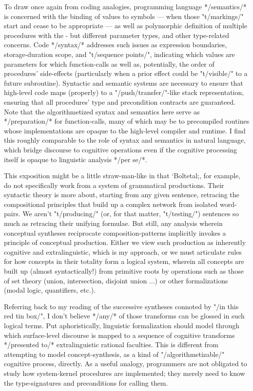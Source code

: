 To draw once again from coding analogies, 
programming language */semantics/* is concerned with the binding 
of values to symbols --- when those "t/markings/" start and 
cease to be appropriate --- as well as polymorphic 
definition of multiple procedures with the -%
but different parameter types, and other type-related 
concerns.  Code */syntax/* addresses such issues as 
expression boundaries, storage-duration scope, and "t/sequence points/", indicating 
which values are parameters for which function-calls as 
well as, potentially, the order of procedures' side-effects 
(particularly when a prior effect could be "t/visible/" to 
a future subroutine).  Syntactic and 
semantic systems are necessary to ensure that high-level code 
maps (properly) to a "/push/transfer/"-like stack representation, ensuring that 
all procedures' type and precondition contracts are guaranteed.
Note that the algorithmetized syntax and semantics here 
serve as */preparation/* for function-calls, many of which 
may be to precompiled routines whose implementations are 
opaque to the high-level compiler and runtime.  I find this 
roughly comparable to the role of syntax and semantics 
in natural language, which bridge discourse to cognitive 
operations even if the cognitive processing itself 
is opaque to linguistic analysis */per se/*. 

This exposition might be a little straw-man-like in that `Boltetal;, 
for example, do not specifically work from a system of grammatical 
productions.  Their syntactic theory is more about, starting 
from any given sentence, retracing the compositional principles 
that build up a complex network from isolated word-pairs.  
We aren't "t/producing/" (or, for that matter, "t/testing/") sentences 
so much as retracing their unifying formulae.  But still,
any analysis wherein conceptual syntheses 
reciprocate composition-patterns implicitly invokes a 
principle of conceptual production.  
Either we view such production as inherently cognitive and extralinguistic, which is
my approach, or we must articulate rules for how concepts
in their totality form a logical system, wherein all concepts are
built up (almost syntactically!) from primitive roots by operations such as
those of set theory (union, intersection, disjoint union ...)
or other formalizations (modal logic, quantifiers, etc.). 
  
Referring back to my reading of the successive syntheses 
connoted by "/in this red tin box/", I don't believe 
*/any/* of those transforms can be glossed in such logical terms.  
Put aphoristically, linguistic formalization should model 
through which surface-level discourse is mapped to a sequence 
of cognitive transforms */presented to/* extralinguistic 
rational faculties.  This is different from attempting 
to model concept-synthesis, as a kind of 
"/algorithmetizable/" cognitive process, 
directly.  As a useful analogy, programmers are not obligated to 
study how system-kernel procedures are implemented; they merely 
need to know the type-signatures and preconditions for calling them. 

